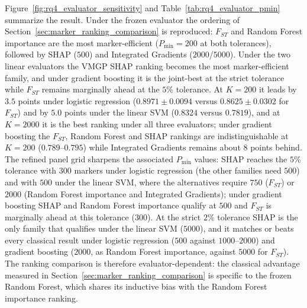 Figure~\ref{fig:rq4_evaluator_sensitivity} and
Table~\ref{tab:rq4_evaluator_pmin} summarize the result. Under the
frozen evaluator the ordering of
Section~\ref{sec:marker_ranking_comparison} is reproduced: $F_{ST}$ and
Random Forest importance are the most marker-efficient
($P_{\min}=200$ at both tolerances), followed by SHAP ($500$) and
Integrated Gradients ($2000$/$5000$). Under the two linear
evaluators the VMGP SHAP ranking becomes the most marker-efficient
family, and under gradient boosting it is the joint-best at the strict
tolerance while $F_{ST}$ remains marginally ahead at the $5\%$
tolerance. At $K=200$ it leads by $3.5$ points under logistic regression
($0.8971 \pm 0.0094$ versus $0.8625 \pm 0.0302$ for $F_{ST}$) and by
$5.0$ points under the linear SVM ($0.8324$ versus $0.7819$), and at
$K=2000$ it is the best ranking under all three evaluators; under
gradient boosting the $F_{ST}$, Random Forest and SHAP rankings are
indistinguishable at $K=200$ ($0.789$--$0.795$) while Integrated
Gradients remains about $8$ points behind. The refined panel grid
sharpens the associated $P_{\min}$ values: SHAP reaches the $5\%$
tolerance with $300$ markers under logistic regression (the other
families need $500$) and with $500$ under the linear SVM, where the
alternatives require $750$ ($F_{ST}$) or $2000$ (Random Forest
importance and Integrated Gradients); under gradient boosting SHAP and
Random Forest importance qualify at $500$ and $F_{ST}$ is marginally
ahead at this tolerance ($300$). At the strict $2\%$ tolerance SHAP is
the only family that qualifies under the linear SVM ($5000$), and it
matches or beats every classical result under logistic regression
($500$ against $1000$--$2000$) and gradient boosting ($2000$, as Random
Forest importance, against $5000$ for $F_{ST}$). The ranking comparison
is therefore evaluator-dependent: the classical advantage measured in
Section~\ref{sec:marker_ranking_comparison} is specific to the frozen
Random Forest, which shares its inductive bias with the Random Forest
importance ranking.

